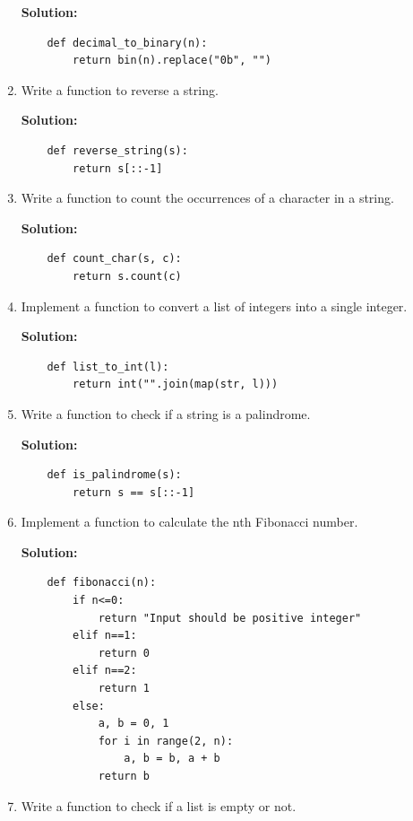 \documentclass[12pt]{book}
\begin{document}
\begin{enumerate}
    \textbf{Solution:}
    \begin{lstlisting}
    def decimal_to_binary(n):
        return bin(n).replace("0b", "")
    \end{lstlisting}

    \item  Write a function to reverse a string.

    \textbf{Solution:}
    \begin{lstlisting}
    def reverse_string(s):
        return s[::-1]
    \end{lstlisting}

    \item  Write a function to count the occurrences of a character in a string.

    \textbf{Solution:}
    \begin{lstlisting}
    def count_char(s, c):
        return s.count(c)
    \end{lstlisting}

    \item  Implement a function to convert a list of integers into a single integer.

    \textbf{Solution:}
    \begin{lstlisting}
    def list_to_int(l):
        return int("".join(map(str, l)))
    \end{lstlisting}

    \item  Write a function to check if a string is a palindrome.

    \textbf{Solution:}
    \begin{lstlisting}
    def is_palindrome(s):
        return s == s[::-1]
    \end{lstlisting}

    \item  Implement a function to calculate the nth Fibonacci number.

    \textbf{Solution:}
    \begin{lstlisting}
    def fibonacci(n):
        if n<=0:
            return "Input should be positive integer"
        elif n==1:
            return 0
        elif n==2:
            return 1
        else:
            a, b = 0, 1
            for i in range(2, n):
                a, b = b, a + b
            return b
    \end{lstlisting}
    
    \item  Write a function to check if a list is empty or not.


\end{enumerate}
\end{document}
